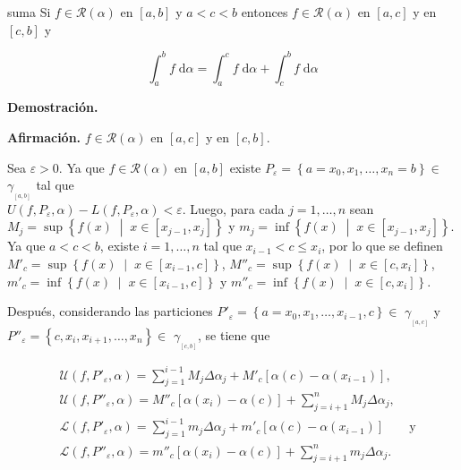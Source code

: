 \documentclass[12pt]{article}
\newenvironment{ejercicio}[1]{\begin{ejer}[breakable, pad at break = 5mm, leftrule = 0.7mm, rightrule = 0.7mm, right = 2mm, left = 2mm, enlarge bottom finally by = 3mm, fontlower = \setlength{\parskip}{2mm}]{}{#1}}{\end{ejer}}
\newcommand{\talque}{\; \middle| \;}
\newcommand{\rsi}[1]{\mathcal{R}(#1)}
\begin{document}

	\begin{ejercicio}{suma}
		Si $ f \in \rsi{\alpha} $ en $ [a,b] $ y $ a < c < b $ entonces $ f \in \rsi{\alpha} $ en $ [a,c] $ y en $ [c,b] $ y

		\begin{equation*}
			\int_{a}^{b} f \; \mathrm{d} \alpha = \int_{a}^{c} f \; \mathrm{d} \alpha + \int_{c}^{b} f \; \mathrm{d} \alpha
		\end{equation*}

		\tcblower

		\textbf{Demostración.} 

		\textbf{Afirmación.} $ f \in \rsi{\alpha} $ en $ [a,c] $ y en $ [c,b] $.

		Sea $ \varepsilon > 0 $. Ya que $ f \in \rsi{\alpha} $ en $ [a,b] $ existe $ P_\varepsilon = \left\lbrace a = x_0, x_1, \ldots, x_n = b \right\rbrace \in $ {\large $ \gamma_{_{[a,b]}} $} tal que \\ $ U(f,P_\varepsilon,\alpha) - L(f,P_\varepsilon,\alpha) < \varepsilon $. Luego, para cada $ j = 1, \ldots, n $ sean $ M_j = \sup \left\lbrace f(x) \talque x \in \left[ x_{j-1}, x_j \right] \right\rbrace $ y $ m_j = \inf \left\lbrace f(x) \talque x \in \left[ x_{j-1}, x_j \right] \right\rbrace $. Ya que $ a < c < b $, existe $ i = 1, \ldots, n $ tal que $ x_{i-1} < c \leq x_i $, por lo que se definen $ M'_c = \sup \left\lbrace f(x) \talque x \in \left[ x_{i-1}, c \right] \right\rbrace $, $ M''_c = \sup \left\lbrace f(x) \talque x \in \left[ c, x_i \right] \right\rbrace $, $ m'_c = \inf \left\lbrace f(x) \talque x \in \left[ x_{i-1}, c \right] \right\rbrace $ y $ m''_c = \inf \left\lbrace f(x) \talque x \in \left[ c, x_i \right] \right\rbrace $.

		Después, considerando las particiones $ P'_\varepsilon = \left\lbrace a = x_0, x_1, \ldots, x_{i-1}, c \right\rbrace \in $ {\large $ \gamma_{_{[a,c]}} $} y \\ $ P''_\varepsilon = \left\lbrace c, x_i, x_{i+1}, \ldots, x_n \right\rbrace \in $ {\large $ \gamma_{_{[c,b]}} $}, se tiene que
		
		\begin{align*}
			&\mathcal{U} \left( f, P'_\varepsilon, \alpha \right) = \sum_{j=1}^{i-1} M_j \Delta \alpha_j + M'_c \left[ \alpha(c) - \alpha\left( x_{i-1} \right) \right], \\
			&\mathcal{U} \left( f, P''_\varepsilon, \alpha \right) = M''_c \left[ \alpha(x_i) - \alpha\left( c \right) \right] + \sum_{j=i+1}^{n} M_j \Delta \alpha_j, \\
			&\mathcal{L} \left( f, P'_\varepsilon, \alpha \right) = \sum_{j=1}^{i-1} m_j \Delta \alpha_j + m'_c \left[ \alpha(c) - \alpha\left( x_{i-1} \right) \right] \qquad \mbox{y} \\
			&\mathcal{L} \left( f, P''_\varepsilon, \alpha \right) = m''_c \left[ \alpha(x_i) - \alpha\left( c \right) \right] + \sum_{j=i+1}^{n} m_j \Delta \alpha_j.
		\end{align*}


\end{ejercicio}
\end{document}
